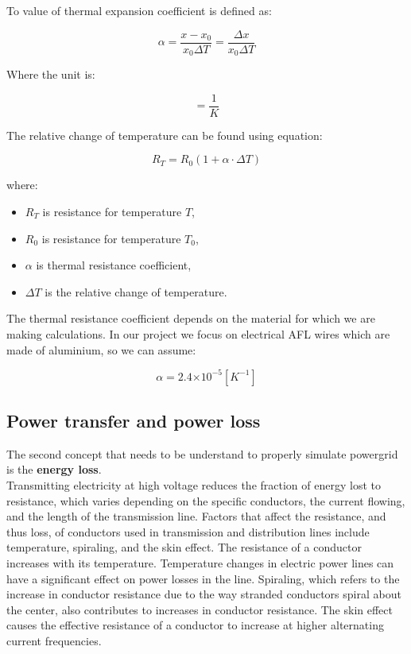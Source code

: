 \documentclass[a4paper]{article}
\providecommand{\e}[1]{\ensuremath{\times 10^{#1}}}
\begin{document}
To value of thermal expansion coefficient is defined as: 

\begin{equation}
\alpha = \frac {x - x_{0}} {x_{0} \Delta T} = \frac {\Delta x} {x_{0} \Delta T}
\end{equation}

Where the unit is:

\begin{equation}
[\alpha] = \frac {1}{K}
\end{equation}

The relative change of temperature can be found using equation: \cite{Art7}

\begin{equation}
R_T=R_0(1+\alpha \cdot \Delta T)
\end{equation}

where:
\begin{itemize}
	\setlength{\itemsep}{1pt}
	\setlength{\parskip}{0pt}
	\setlength{\parsep}{0pt}
\item $R_T$ is resistance for temperature $T$,
\item $R_0$ is resistance for temperature $T_0$,
\item $\alpha$ is thermal resistance coefficient,
\item $\Delta T$ is the relative change of temperature.\\
\end{itemize}

The thermal resistance coefficient depends on the material for which we are making calculations. In our project we focus on electrical AFL wires which are made of aluminium, so we can assume:

\begin{equation}
\alpha = 2.4\e{-5} [K^{-1}]
\end{equation}

\subsection{Power transfer and power loss}
\label{sec:powerTransferAndPowerLoss}

The second concept that needs to be understand to properly simulate powergrid is the \textbf{energy loss}.\\ 

Transmitting electricity at high voltage reduces the fraction of energy lost to resistance, which varies depending on the specific conductors, the current flowing, and the length of the transmission line. Factors that affect the resistance, and thus loss, of conductors used in transmission and distribution lines include temperature, spiraling, and the skin effect. The resistance of a conductor increases with its temperature. Temperature changes in electric power lines can have a significant effect on power losses in the line. Spiraling, which refers to the increase in conductor resistance due to the way stranded conductors spiral about the center, also contributes to increases in conductor resistance. The skin effect causes the effective resistance of a conductor to increase at higher alternating current frequencies. \cite{Art8}\\
\end{document}
